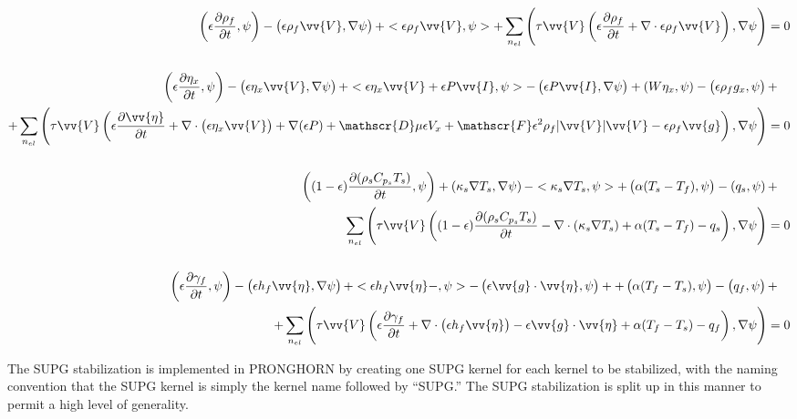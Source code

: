 \documentclass[10pt]{article}
\numberwithin{equation}{section} %
\begin{document}
\begin{equation}
\label{eq:SUPGWeakForms}
\begin{aligned}
\left(\epsilon \frac{\partial\rho_f}{\partial t},\psi\right)-\left(\epsilon\rho_f\vv{V},\nabla\psi\right)+< \epsilon\rho_f\vv{V},\psi> +\sum_{n_{el}}^{}\left(\tau\vv{V}\left(\epsilon \frac{\partial\rho_f}{\partial t}+\nabla\cdot\epsilon\rho_f\vv{V}\right),\nabla\psi\right)=0\\
 \\
\left(\epsilon\frac{\partial\eta_x}{\partial t},\psi\right)-\left(\epsilon\eta_x\vv{V},\nabla\psi\right)+<\epsilon\eta_x\vv{V} + \epsilon P\vv{I},\psi>-\left(\epsilon P\vv{I},\nabla\psi\right)+\left(W\eta_x,\psi\right)-\left(\epsilon\rho_f g_x,\psi\right)+\quad\\
+\sum_{n_{el}}^{}\left(\tau\vv{V}\left(\epsilon\frac{\partial\vv{\eta}}{\partial t}+\nabla\cdot\left(\epsilon\eta_x\vv{V}\right)+\nabla(\epsilon P)+\mathscr{D}\mu\epsilon V_x+\mathscr{F}\epsilon^2\rho_f|\vv{V}|\vv{V}-\epsilon\rho_f\vv{g}\right),\nabla\psi\right)=0\\
 \\
 \left((1-\epsilon)\frac{\partial(\rho_s C_{p_s}T_s)}{\partial t},\psi\right)+\left(\kappa_s\nabla T_s,\nabla\psi\right)-<\kappa_s\nabla T_s,\psi>+\left(\alpha(T_s-T_f),\psi\right)-\left(q_s,\psi\right)+\quad\\
 \sum_{n_{el}}^{}\left(\tau\vv{V}\left((1-\epsilon)\frac{\partial(\rho_s C_{p_s}T_s)}{\partial t}-\nabla\cdot(\kappa_s\nabla T_s)+\alpha(T_s-T_f)-q_s\right), \nabla\psi\right)=0\\
 \\
\left(\epsilon\frac{\partial\gamma_f}{\partial t},\psi\right)-\left(\epsilon h_f\vv{\eta},\nabla\psi\right)+<\epsilon h_f\vv{\eta}-,\psi>-\left(\epsilon\vv{g}\cdot\vv{\eta},\psi\right)++\left(\alpha(T_f-T_s),\psi\right)-\left(q_f,\psi\right)+\quad\\
+\sum_{n_{el}}^{}\left(\tau\vv{V}\left(\epsilon\frac{\partial\gamma_f}{\partial t}+\nabla\cdot\left(\epsilon h_f\vv{\eta}\right)-\epsilon\vv{g}\cdot\vv{\eta}+\alpha(T_f-T_s)-q_f\right),\nabla\psi\right)=0\\
\end{aligned}
\end{equation}

The SUPG stabilization is implemented in PRONGHORN by creating one SUPG kernel for each kernel to be stabilized, with the naming convention that the SUPG kernel is simply the kernel name followed by ``SUPG.'' The SUPG stabilization is split up in this manner to permit a high level of generality. 
\end{document}
